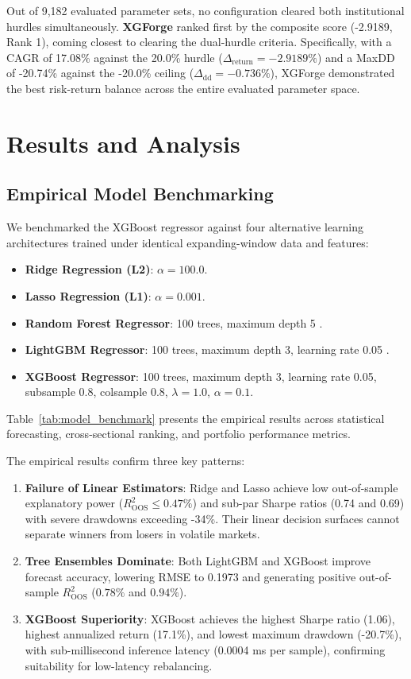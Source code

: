 Out of 9,182 evaluated parameter sets, no configuration cleared both institutional hurdles simultaneously. \textbf{XGForge} ranked first by the composite score (-2.9189, Rank 1), coming closest to clearing the dual-hurdle criteria. Specifically, with a CAGR of 17.08\% against the 20.0\% hurdle ($\Delta_{\text{return}} = -2.9189\%$) and a MaxDD of -20.74\% against the -20.0\% ceiling ($\Delta_{\text{dd}} = -0.736\%$), XGForge demonstrated the best risk-return balance across the entire evaluated parameter space.


\section{Results and Analysis}
\label{sec:results}

\subsection{Empirical Model Benchmarking}
We benchmarked the XGBoost regressor against four alternative learning architectures trained under identical expanding-window data and features:
\begin{itemize}
    \item \textbf{Ridge Regression (L2)}: $\alpha = 100.0$.
    \item \textbf{Lasso Regression (L1)}: $\alpha = 0.001$.
    \item \textbf{Random Forest Regressor}: 100 trees, maximum depth 5 \cite{breiman2001random}.
    \item \textbf{LightGBM Regressor}: 100 trees, maximum depth 3, learning rate 0.05 \cite{ke2017lightgbm}.
    \item \textbf{XGBoost Regressor}: 100 trees, maximum depth 3, learning rate 0.05, subsample 0.8, colsample 0.8, $\lambda = 1.0$, $\alpha = 0.1$.
\end{itemize}

Table~\ref{tab:model_benchmark} presents the empirical results across statistical forecasting, cross-sectional ranking, and portfolio performance metrics.



The empirical results confirm three key patterns:
\begin{enumerate}
    \item \textbf{Failure of Linear Estimators}: Ridge and Lasso achieve low out-of-sample explanatory power ($R^2_{\text{OOS}} \le 0.47\%$) and sub-par Sharpe ratios (0.74 and 0.69) with severe drawdowns exceeding -34\%. Their linear decision surfaces cannot separate winners from losers in volatile markets.
    \item \textbf{Tree Ensembles Dominate}: Both LightGBM and XGBoost improve forecast accuracy, lowering RMSE to 0.1973 and generating positive out-of-sample $R^2_{\text{OOS}}$ ($0.78\%$ and $0.94\%$).
    \item \textbf{XGBoost Superiority}: XGBoost achieves the highest Sharpe ratio (1.06), highest annualized return (17.1\%), and lowest maximum drawdown (-20.7\%), with sub-millisecond inference latency (0.0004 ms per sample), confirming suitability for low-latency rebalancing.
\end{enumerate}

